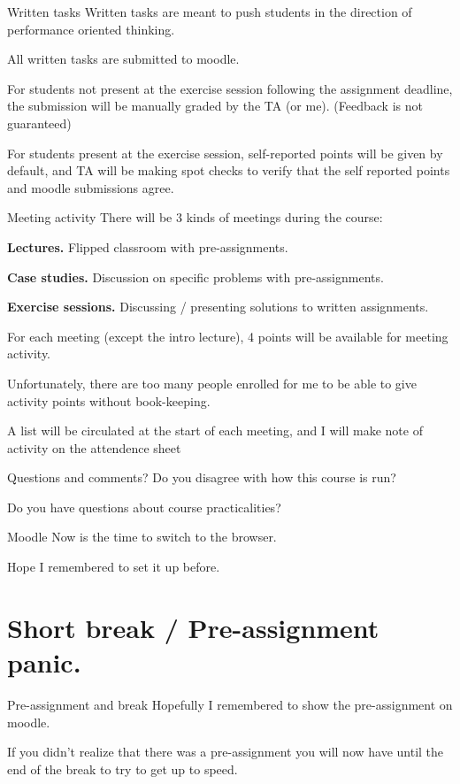 \documentclass[11pt, aspectratio=169, table]{beamer}
\begin{document}
\begin{frame}{Written tasks}
\setlength\parskip{\fill}
Written tasks are meant to push students in the direction of performance oriented thinking.

All written tasks are submitted to moodle.

For students not present at the exercise session following the assignment deadline, the submission will be 
manually graded by the TA (or me). (Feedback is not guaranteed)

For students present at the exercise session, self-reported points will be given by default, and TA will be making 
spot checks to verify that the self reported points and moodle submissions agree.
\end{frame}


\begin{frame}{Meeting activity}
There will be 3 kinds of meetings during the course:
\begin{description}
	\item{{\bf Lectures.}} Flipped classroom with pre-assignments.
	\item{{\bf Case studies.}} Discussion on specific problems with pre-assignments.
	\item{{\bf Exercise sessions.}} Discussing / presenting solutions to written assignments.
\end{description}

For each meeting (except the intro lecture), 4 points will be available for meeting activity.

Unfortunately, there are too many people enrolled for me to be able to give activity points without book-keeping.

A list will be circulated at the start of each meeting, and I will make note of activity on the attendence sheet
\end{frame}

\begin{frame}{Questions and comments?}
\setlength\parskip{\fill}
Do you disagree with how this course is run?

Do you have questions about course practicalities?
\end{frame}

\begin{frame}{Moodle}
\setlength\parskip{\fill}
Now is the time to switch to the browser.

Hope I remembered to set it up before.
\end{frame}

\section{Short break / Pre-assignment panic.}
\begin{frame}{Pre-assignment and break}
\setlength\parskip{\fill}
Hopefully I remembered to show the pre-assignment on moodle.

If you didn't realize that there was a pre-assignment you will now have until the end of the break to try to get up to speed.
\end{frame}
\end{document}
